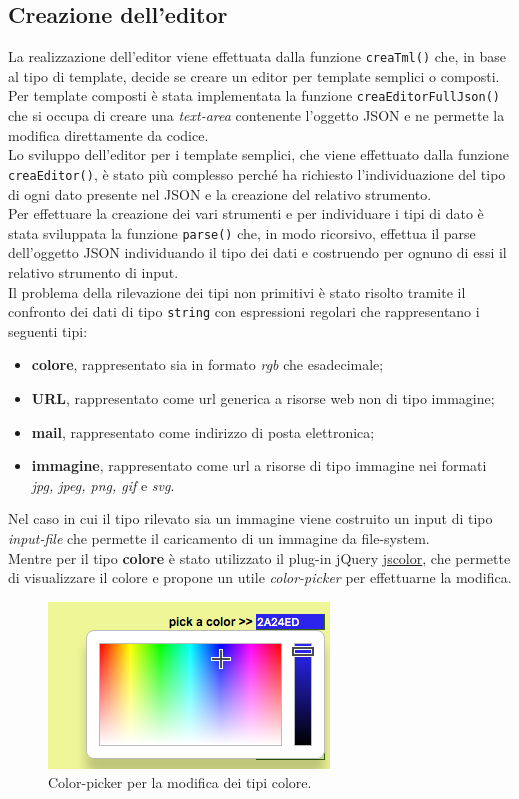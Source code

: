\subsection{Creazione dell'editor}
La realizzazione dell'editor viene effettuata dalla funzione \texttt{creaTml()} che, in base al tipo di template, decide se creare un editor per template semplici o composti.\\
Per template composti è stata implementata la funzione \texttt{creaEditorFullJson()} che si occupa di creare una \textit{text-area} contenente l'oggetto JSON e ne permette la modifica direttamente da codice.\\
Lo sviluppo dell'editor per i template semplici, che viene effettuato dalla funzione \texttt{creaEditor()}, è stato più complesso perché ha richiesto l'individuazione del tipo di ogni dato presente nel JSON e la creazione del relativo strumento.\\
Per effettuare la creazione dei vari strumenti e per individuare i tipi di dato è stata sviluppata la funzione \texttt{parse()} che, in modo ricorsivo, effettua il parse dell'oggetto JSON individuando il tipo dei dati e costruendo per ognuno di essi il relativo strumento di input.\\
Il problema della rilevazione dei tipi non primitivi è stato risolto tramite il confronto dei dati di tipo \texttt{string} con espressioni regolari che rappresentano i seguenti tipi:
\begin{itemize}
	\item \textbf{colore}, rappresentato sia in formato \textit{rgb} che esadecimale;
	\item \textbf{URL}, rappresentato come url generica a risorse web non di tipo immagine;
	\item \textbf{mail}, rappresentato come indirizzo di posta elettronica;
	\item \textbf{immagine}, rappresentato come url a risorse di tipo immagine nei formati \textit{jpg, jpeg, png, gif} e \textit{svg}.
\end{itemize}
Nel caso in cui il tipo rilevato sia un immagine viene costruito un input di tipo \textit{input-file} che permette il caricamento di un immagine da file-system.\\
Mentre per il tipo \textbf{colore} è stato utilizzato il plug-in jQuery \href{http://jscolor.com/}{jscolor}, che permette di visualizzare il colore e propone un utile \textit{color-picker} per effettuarne la modifica.\\
\begin{figure}[htp]
	\centering
	\includegraphics[scale=1]{../immagini/color_picker}
	\caption{Color-picker per la modifica dei tipi colore.}
\end{figure}
